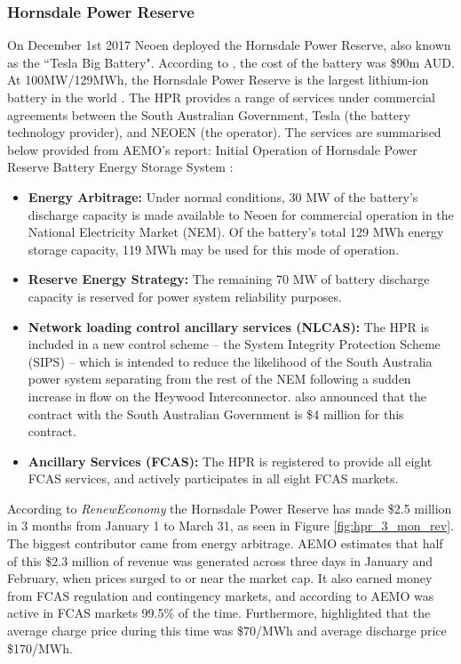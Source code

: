 \subsubsection{ Hornsdale Power Reserve }
\label{hornsdale}
On December 1st 2017 Neoen deployed the Hornsdale Power Reserve, also known as the ``Tesla Big Battery". According to \parencite{HornsdaleRenewEconomy}, the cost of the battery was \$90m AUD. At 100MW/129MWh, the Hornsdale Power Reserve is the largest lithium-ion battery in the world \parencite{HornsdaleWebsite}. The HPR provides a range of services under commercial agreements between the South Australian Government, Tesla (the battery technology provider), and NEOEN (the operator). The services are summarised below provided from AEMO's report: Initial Operation of Hornsdale Power Reserve Battery Energy Storage System \parencite{HornsdaleReport}:
\begin{itemize}
    \item \textbf{Energy Arbitrage:} Under normal conditions, 30 MW of the battery’s discharge capacity is made available to Neoen for commercial operation in the National Electricity Market (NEM). Of the battery’s total 129 MWh energy storage capacity, 119 MWh may be used for this mode of operation.
    \item \textbf{Reserve Energy Strategy:} The remaining 70 MW of battery discharge capacity is reserved for power system reliability purposes.
    \item \textbf{Network loading control ancillary services (NLCAS):} The HPR is included in a new control scheme – the System Integrity Protection Scheme (SIPS) – which is intended to reduce the likelihood of the South Australia power system separating from the rest of the NEM following a sudden increase in flow on the Heywood Interconnector. \parencite{HornsdaleRenewEconomy} also announced that the contract with the South Australian Government is \$4 million for this contract. 
    \item \textbf{Ancillary Services (FCAS):} The HPR is registered to provide all eight FCAS services, and actively participates in all eight FCAS markets.
\end{itemize}
According to \textit{RenewEconomy} the Hornsdale Power Reserve has made \$2.5 million  in 3 months from January 1 to March 31, as seen in Figure \ref{fig:hpr_3_mon_rev}. The biggest contributor came from energy arbitrage. AEMO estimates that half of this \$2.3 million of revenue was generated across three days in January and February, when prices surged to or near the market cap. It also earned money from FCAS regulation and contingency markets, and according to AEMO was active in FCAS markets 99.5\% of the time. Furthermore, \textcite{HornsdaleRenewEconomy} highlighted that the average charge price during this time was \$70/MWh and average discharge price \$170/MWh. 
